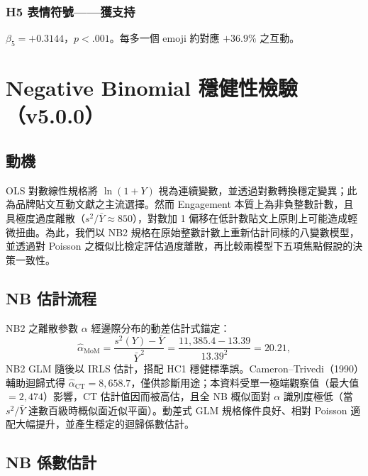 \documentclass[12pt,a4paper]{ctexart}
\begin{document}
\subsubsection*{H5 表情符號——獲支持}
$\beta_5 = +0.3144$，$p<.001$。每多一個 emoji 約對應 $+36.9\%$ 之互動。

\newpage

\section{Negative Binomial 穩健性檢驗（v5.0.0）}
\label{sec:nb}

\subsection{動機}

OLS 對數線性規格將 $\ln(1+Y)$ 視為連續變數，並透過對數轉換穩定變異；此為品牌貼文互動文獻之主流選擇。然而 Engagement 本質上為非負整數計數，且具極度過度離散（$s^2/\bar Y\approx 850$），對數加 1 偏移在低計數貼文上原則上可能造成輕微扭曲。為此，我們以 NB2 規格在原始整數計數上重新估計同樣的八變數模型，並透過對 Poisson 之概似比檢定評估過度離散，再比較兩模型下五項焦點假說的決策一致性。

\subsection{NB 估計流程}

NB2 之離散參數 $\alpha$ 經邊際分布的動差估計式錨定：
\begin{equation}
\hat\alpha_{\text{MoM}} = \frac{s^2(Y)-\bar Y}{\bar Y^{\,2}} = \frac{11{,}385.4-13.39}{13.39^{2}} = 20.21,
\end{equation}
NB2 GLM 隨後以 IRLS 估計，搭配 HC1 穩健標準誤。Cameron--Trivedi（1990）輔助迴歸式得 $\hat\alpha_{\text{CT}}=8{,}658.7$，僅供診斷用途；本資料受單一極端觀察值（最大值 $=2{,}474$）影響，CT 估計值因而被高估，且全 NB 概似面對 $\alpha$ 識別度極低（當 $s^2/\bar Y$ 達數百級時概似面近似平面）。動差式 GLM 規格條件良好、相對 Poisson 適配大幅提升，並產生穩定的迴歸係數估計。

\subsection{NB 係數估計}
\end{document}
